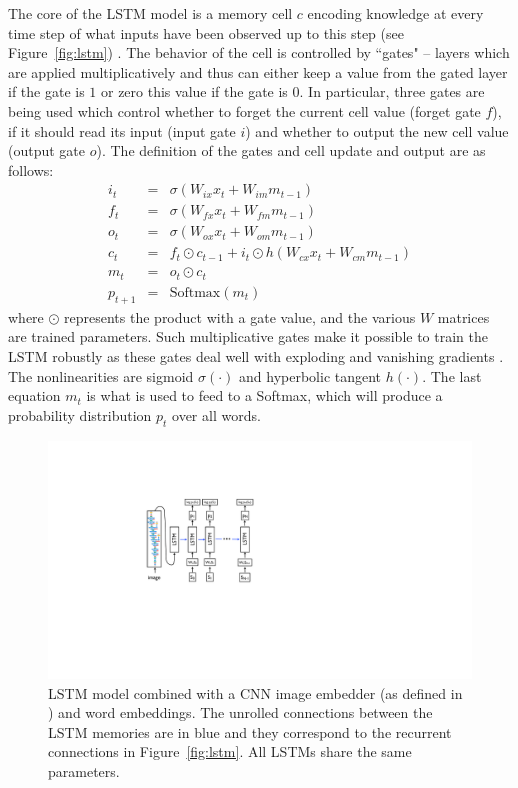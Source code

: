 The core of the LSTM model is a memory cell $c$ encoding
knowledge at every time step of what inputs have been observed up to this step (see Figure~\ref{fig:lstm}) . The behavior of the cell
is controlled by ``gates" -- layers which are applied multiplicatively and thus can
either keep a value from the gated layer if the gate is $1$ or zero this value if the gate is $0$.
In particular, three gates are being used which control whether to forget the current cell value (forget gate $f$),
if it should read its input (input gate $i$) and whether to output the new cell value (output gate $o$).
The definition of the gates and cell update and output are as follows:
\begin{eqnarray}
i_t &= &\sigma(W_{ix} x_t+ W_{im} m_{t-1}) \\
f_t  &= & \sigma(W_{fx} x_t+ W_{fm} m_{t-1}) \\
o_t  &= & \sigma(W_{ox} x_t + W_{om} m_{t-1})  \\
c_t  &= & f_t \odot c_{t-1} + i_t \odot h(W_{cx} x_t + W_{cm} m_{t-1}) \\
m_t  &= & o_t \odot c_t \\
p_{t+1} &=& \textrm{Softmax}(m_t) 
\end{eqnarray}
where $\odot$ represents the product with a gate value, and the various $W$
matrices are trained parameters. Such multiplicative gates make it
possible to train the LSTM robustly as these gates deal well with exploding and vanishing gradients \cite{hochreiter1997long}.
The nonlinearities are sigmoid $\sigma(\cdot)$ and hyperbolic tangent $h(\cdot)$.
The last equation $m_t$ is what is used
to feed to a Softmax, which will produce a probability distribution $p_t$ over all words.

\begin{figure}
\begin{center}
\includegraphics[width=0.75\columnwidth]{unrolled_lstm.pdf}
\end{center}
\caption{\label{fig:unrolled_lstm} LSTM model combined with a CNN image embedder (as defined in \cite{batchnorm}) and word embeddings. The unrolled connections between the LSTM memories are in blue and they correspond to the recurrent connections in Figure~\ref{fig:lstm}. All LSTMs share the same parameters. }
\end{figure}
